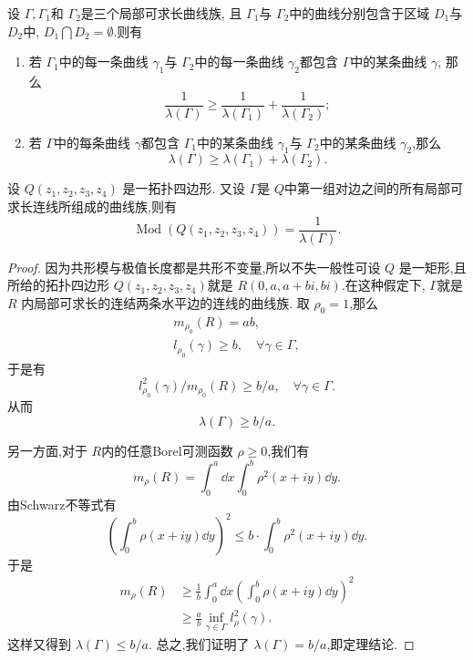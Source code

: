 \begin{thm}[合成原理]
    设 $\Gamma,\Gamma_1$和 $\Gamma_2$是三个局部可求长曲线族, 且 $\Gamma_1$与 $\Gamma_2$中的曲线分别包含于区域 $D_1$与 $D_2$中, $D_1 \bigcap D_2=\emptyset$.则有
    \begin{enumerate}[label=(\roman*),font=\upshape]
        \item 若 $\Gamma_1$中的每一条曲线 $\gamma_1$与 $\Gamma_2$中的每一条曲线 $\gamma_2$都包含 $\Gamma$中的某条曲线 $\gamma$, 那么
        \[\frac{1}{\lambda (\Gamma)}\geqslant \frac{1}{\lambda (\Gamma_1)}+\frac{1}{\lambda (\Gamma_2)};\]
    \item 若 $\Gamma$中的每条曲线 $\gamma$都包含 $\Gamma_1$中的某条曲线 $\gamma_1$与 $\Gamma_2$中的某条曲线 $\gamma_2$,那么
    \[\lambda (\Gamma)\geqslant\lambda (\Gamma_1)+\lambda (\Gamma_2).\]
    \end{enumerate}
\end{thm}

\begin{thm}
    设 $Q(z_1,z_2,z_3,z_4)$ 是一拓扑四边形. 又设 $\Gamma$是 $Q$中第一组对边之间的所有局部可求长连线所组成的曲线族,则有
    \[\operatorname{Mod} (Q(z_1,z_2,z_3,z_4))=\frac{1}{\lambda(\Gamma)}.\]
\end{thm}
\begin{proof}
    因为共形模与极值长度都是共形不变量,所以不失一般性可设 $Q$ 是一矩形,且所给的拓扑四边形 $Q(z_1,z_2,z_3,z_4)$就是 $R(0,a,a+bi,bi)$.在这种假定下, $\Gamma$就是 $R$ 内局部可求长的连结两条水平边的连线的曲线族. 取 $\rho_0=1$,那么
    \begin{align*}
        m_{\rho_{0}} (R)=ab,\\ 
        l_{\rho_0} (\gamma)\geqslant b,\quad\forall \gamma \in \Gamma,
    \end{align*}
    于是有
    \[l^2_{\rho_0}(\gamma)/m_{\rho_0}(R)\geqslant b/a,\quad\forall \gamma \in \Gamma.\]
    从而 
    \[\lambda(\Gamma)\geqslant b/a.\]
    
    另一方面,对于 $R$内的任意Borel可测函数 $\rho\geqslant 0$,我们有
    \[m_{\rho}(R)=\int_0^a \dd x\int_0^b \rho^2 (x+iy)\dd y.\]
    由Schwarz不等式有
    \[\left( \int_0^b \rho(x+iy)\dd y \right)^2 \leqslant b\cdot \int_0^b \rho^2 (x+iy)\dd y.\]
    于是
    \begin{align*}
        m_{\rho}(R)&\geqslant \frac 1b \int_0^a \dd x \left(\int_0^b \rho (x+iy)\dd y\right)^2\\ 
        &\geqslant\frac ab \inf_{\gamma\in \Gamma}l^2_{\rho}(\gamma). 
    \end{align*}
    这样又得到 $\lambda(\Gamma)\leqslant b/a$.
    总之,我们证明了 $\lambda(\Gamma)=b/a$,即定理结论.
\end{proof}

